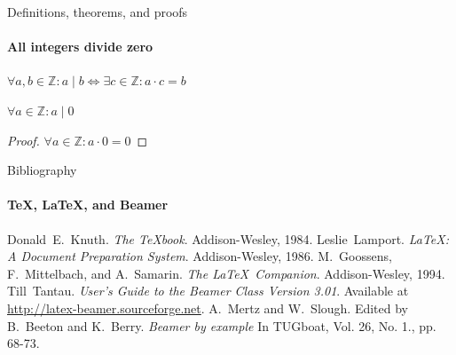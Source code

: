 \documentclass{beamer}
\begin{document}
   \begin{frame}[label=proof]{Definitions, theorems, and proofs}
      \framesubtitle{All integers divide zero}
      \begin{definition}
         $\forall a,b\in\mathds{Z}: a\mid b\iff\exists c\in\mathds{Z}:a\cdot c=b$
      \end{definition}
      \begin{theorem}
         $\forall a\in\mathds{Z}: a\mid 0$
      \end{theorem}
      \begin{proof}[Proof\nopunct]
         $\forall a\in\mathds{Z}: a\cdot 0=0$
      \end{proof}
   \end{frame}


   \begin{frame}[label=bibliography]{Bibliography}
      \framesubtitle{\TeX, \LaTeX, and Beamer}
      \begin{thebibliography}{9}
               Donald~E.~Knuth.
               \emph{The \TeX book}.
               Addison-Wesley, 1984.
               Leslie~Lamport.
               \emph{\LaTeX : A Document Preparation System}.
               Addison-Wesley, 1986.
               M.~Goossens, F.~Mittelbach, and A.~Samarin.
               \emph{The \LaTeX\ Companion}.
               Addison-Wesley, 1994.
               Till~Tantau.
               \emph{User's Guide to the Beamer Class Version 3.01}.
               Available at \url{http://latex-beamer.sourceforge.net}.
               A.~Mertz and W.~Slough.
               Edited by B.~Beeton and K.~Berry.
               \emph{Beamer by example} In TUGboat,
                  Vol. 26, No. 1., pp. 68-73.
      \end{thebibliography}
   \end{frame}
\end{document}
